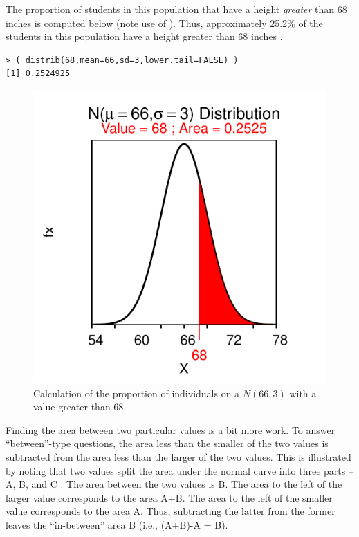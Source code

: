 \documentclass[10pt,openany]{book}\usepackage[]{graphicx}\usepackage[]{color}
\makeatletter
\newenvironment{kframe}{%
 \def\at@end@of@kframe{}%
 \ifinner\ifhmode%
  \def\at@end@of@kframe{\end{minipage}}%
  \begin{minipage}{\columnwidth}%
 \fi\fi%
 \def\FrameCommand##1{\hskip\@totalleftmargin \hskip-\fboxsep
 \colorbox{shadecolor}{##1}\hskip-\fboxsep
     \hskip-\linewidth \hskip-\@totalleftmargin \hskip\columnwidth}%
 \MakeFramed {\advance\hsize-\width
   \@totalleftmargin\z@ \linewidth\hsize
   \@setminipage}}%
 {\par\unskip\endMakeFramed%
 \at@end@of@kframe}
\newenvironment{knitrout}{}{} %
\makeatother
\begin{document}
The proportion of students in this population that have a height \textit{greater} than 68 inches is computed below (note use of ). Thus, approximately 25.2\% of the students in this population have a height greater than 68 inches .
\begin{knitrout}
\color{fgcolor}\begin{kframe}
\begin{verbatim}
> ( distrib(68,mean=66,sd=3,lower.tail=FALSE) )
[1] 0.2524925
\end{verbatim}
\end{kframe}\begin{figure}[hbtp]

{\centering \includegraphics[width=.4\linewidth]{Figs/NormZCalc2-1} 

}

\caption[Calculation of the proportion of individuals on a $N(66,3)$ with a value greater than 68]{Calculation of the proportion of individuals on a $N(66,3)$ with a value greater than 68.}\label{fig:NormZCalc2}
\end{figure}


\end{knitrout}


Finding the area between two particular values is a bit more work.  To answer ``between''-type questions, the area less than the smaller of the two values is subtracted from the area less than the larger of the two values.  This is illustrated by noting that two values split the area under the normal curve into three parts -- A, B, and C .  The area between the two values is B.  The area to the left of the larger value corresponds to the area A+B.  The area to the left of the smaller value corresponds to the area A.  Thus, subtracting the latter from the former leaves the ``in-between'' area B (i.e., (A+B)-A = B).
\end{document}
